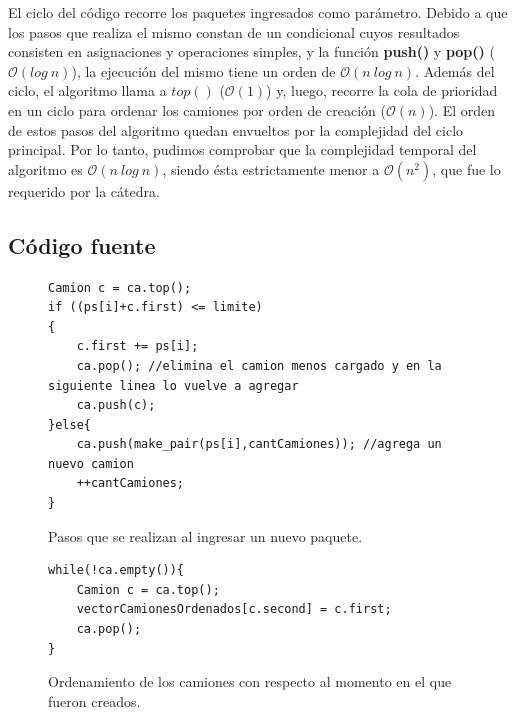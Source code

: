 \newline
El ciclo del código recorre los paquetes ingresados como parámetro. Debido a que los pasos que realiza el mismo constan de un condicional cuyos resultados consisten en asignaciones y operaciones simples, y la función \textbf{push()} y \textbf{pop()} ($\mathcal{O}(log\ n)$), la ejecución del mismo tiene un orden de $\mathcal{O}(n\ log\ n)$.\newline
\newline
Además del ciclo, el algoritmo llama a $top()$ ($\mathcal{O}(1)$\footnotemark[1]) y, luego, recorre la cola de prioridad en un ciclo para ordenar los camiones por orden de creación ($\mathcal{O}(n)$). El orden de estos pasos del algoritmo quedan envueltos por la complejidad del ciclo principal. Por lo tanto, pudimos comprobar que la complejidad temporal del algoritmo es $\mathcal{O}(n\ log\ n)$, siendo ésta estrictamente menor a $\mathcal{O}(n^2)$, que fue lo requerido por la cátedra.

\subsection{Código fuente}

\begin{figure}[H]
\begin{center}
\begin{verbatim}
Camion c = ca.top();
if ((ps[i]+c.first) <= limite)
{
	c.first += ps[i];
	ca.pop(); //elimina el camion menos cargado y en la siguiente linea lo vuelve a agregar
	ca.push(c);
}else{
	ca.push(make_pair(ps[i],cantCamiones)); //agrega un nuevo camion
	++cantCamiones;
}
\end{verbatim}
\caption{Pasos que se realizan al ingresar un nuevo paquete.}

\begin{verbatim}
while(!ca.empty()){
	Camion c = ca.top();
	vectorCamionesOrdenados[c.second] = c.first;
	ca.pop();
}
\end{verbatim}
\caption{Ordenamiento de los camiones con respecto al momento en el que fueron creados.}
\end{center}
\end{figure}

